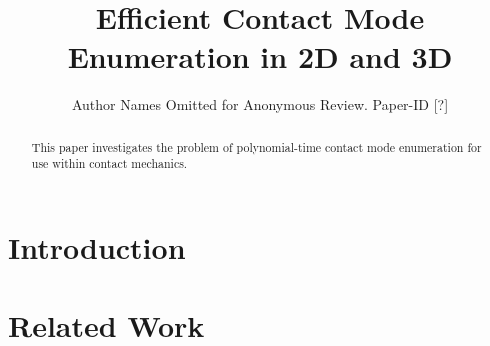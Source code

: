 \documentclass[conference]{IEEEtran}
\begin{document}
\title{\huge Efficient Contact Mode Enumeration in 2D and 3D}

\author{Author Names Omitted for Anonymous Review. Paper-ID [?]}



\maketitle

\begin{abstract}
This paper investigates the problem of polynomial-time contact mode enumeration
for use within contact mechanics.
\end{abstract}
 
\IEEEpeerreviewmaketitle

\section{Introduction}

\section{Related Work}
\end{document}
